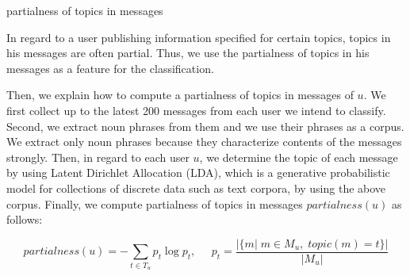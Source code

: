\begin{description}
\bf {\item[(iv)] partialness of topics in messages}
\end{description}

In regard to a user publishing information specified for certain topics,
topics in his messages are often partial.  Thus, we use the
partialness of topics in his messages as a feature for the
classification.

Then, we explain how to compute a partialness of topics in messages of
$u$.  We first collect up to the latest 200 messages from each user we
intend to classify.  Second,
we extract noun phrases from them and we use their phrases as a corpus.
We extract only noun phrases because they characterize contents of the
messages strongly.  Then, in regard to each user $u$, we determine the
topic of each message by
using Latent Dirichlet Allocation (LDA), which is a generative
probabilistic model for collections of discrete data such as text
corpora, by using the above corpus.  Finally, we compute partialness of
topics in messages $\mathit{partialness}(u)$ as follows:

\vspace{-3ex}
\[
 \mathit{partialness}(u) = - \sum_{t \in T_u} p_t \log p_t,\;\;\;\;\;
 p_t = \frac{|\{m|\;m \in M_u,\;\mathit{topic}(m) = t\}|}{|M_u|}
\]
\vspace{-3ex}

